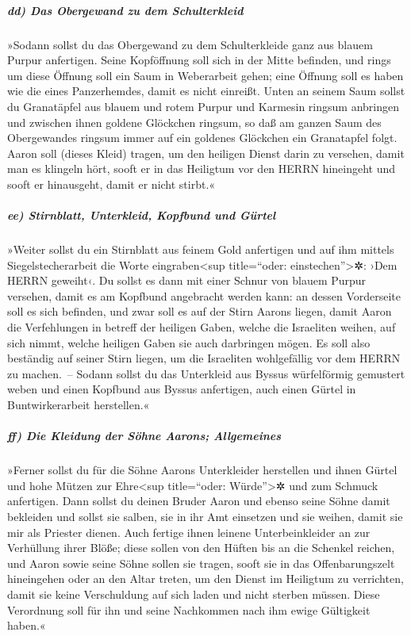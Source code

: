 \hypertarget{dd-das-obergewand-zu-dem-schulterkleid}{%
\subparagraph{dd) Das Obergewand zu dem
Schulterkleid}\label{dd-das-obergewand-zu-dem-schulterkleid}}

 »Sodann sollst du das Obergewand zu dem Schulterkleide
ganz aus blauem Purpur anfertigen.  Seine Kopföffnung
soll sich in der Mitte befinden, und rings um diese Öffnung soll ein
Saum in Weberarbeit gehen; eine Öffnung soll es haben wie die eines
Panzerhemdes, damit es nicht einreißt.  Unten an seinem
Saum sollst du Granatäpfel aus blauem und rotem Purpur und Karmesin
ringsum anbringen und zwischen ihnen goldene Glöckchen ringsum,
 so daß am ganzen Saum des Obergewandes ringsum immer auf
ein goldenes Glöckchen ein Granatapfel folgt.  Aaron soll
(dieses Kleid) tragen, um den heiligen Dienst darin zu versehen, damit
man es klingeln hört, sooft er in das Heiligtum vor den HERRN hineingeht
und sooft er hinausgeht, damit er nicht stirbt.«

\hypertarget{ee-stirnblatt-unterkleid-kopfbund-und-guxfcrtel}{%
\subparagraph{ee) Stirnblatt, Unterkleid, Kopfbund und
Gürtel}\label{ee-stirnblatt-unterkleid-kopfbund-und-guxfcrtel}}

 »Weiter sollst du ein Stirnblatt aus feinem Gold
anfertigen und auf ihm mittels Siegelstecherarbeit die Worte
eingraben\textless sup title=``oder: einstechen''\textgreater✲: ›Dem
HERRN geweiht‹.  Du sollst es dann mit einer Schnur von
blauem Purpur versehen, damit es am Kopfbund angebracht werden kann: an
dessen Vorderseite soll es sich befinden,  und zwar soll
es auf der Stirn Aarons liegen, damit Aaron die Verfehlungen in betreff
der heiligen Gaben, welche die Israeliten weihen, auf sich nimmt, welche
heiligen Gaben sie auch darbringen mögen. Es soll also beständig auf
seiner Stirn liegen, um die Israeliten wohlgefällig vor dem HERRN zu
machen.~--  Sodann sollst du das Unterkleid aus Byssus
würfelförmig gemustert weben und einen Kopfbund aus Byssus anfertigen,
auch einen Gürtel in Buntwirkerarbeit herstellen.«

\hypertarget{ff-die-kleidung-der-suxf6hne-aarons-allgemeines}{%
\subparagraph{ff) Die Kleidung der Söhne Aarons;
Allgemeines}\label{ff-die-kleidung-der-suxf6hne-aarons-allgemeines}}

 »Ferner sollst du für die Söhne Aarons Unterkleider
herstellen und ihnen Gürtel und hohe Mützen zur Ehre\textless sup
title=``oder: Würde''\textgreater✲ und zum Schmuck anfertigen.
 Dann sollst du deinen Bruder Aaron und ebenso seine
Söhne damit bekleiden und sollst sie salben, sie in ihr Amt einsetzen
und sie weihen, damit sie mir als Priester dienen.  Auch
fertige ihnen leinene Unterbeinkleider an zur Verhüllung ihrer Blöße;
diese sollen von den Hüften bis an die Schenkel reichen, 
und Aaron sowie seine Söhne sollen sie tragen, sooft sie in das
Offenbarungszelt hineingehen oder an den Altar treten, um den Dienst im
Heiligtum zu verrichten, damit sie keine Verschuldung auf sich laden und
nicht sterben müssen. Diese Verordnung soll für ihn und seine Nachkommen
nach ihm ewige Gültigkeit haben.«

